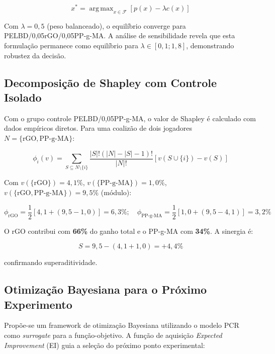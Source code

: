 \documentclass[12pt,a4paper,twoside]{article}
\DeclareMathOperator*{\argmax}{arg\,max}
\begin{document}
\begin{equation}
x^* = \argmax_{x \in \mathcal{F}} \left[p(x) - \lambda c(x)\right]
\label{eq:nash_equilibrium}
\end{equation}

Com $\lambda = 0,5$ (peso balanceado), o equilíbrio converge para PELBD/0,05rGO/0,05PP-g-MA. A análise de sensibilidade revela que esta formulação permanece como equilíbrio para $\lambda \in [0,1; 1,8]$, demonstrando robustez da decisão.

\subsection{Decomposição de Shapley com Controle Isolado}

Com o grupo controle PELBD/0,05PP-g-MA, o valor de Shapley \cite{Shapley1953} é calculado com dados empíricos diretos. Para uma coalizão de dois jogadores $N = \{\text{rGO}, \text{PP-g-MA}\}$:

\begin{equation}
\phi_i(v) = \sum_{S \subseteq N \setminus \{i\}} \frac{|S|! (|N|-|S|-1)!}{|N|!} [v(S \cup \{i\}) - v(S)]
\label{eq:shapley}
\end{equation}

Com $v(\{\text{rGO}\}) = 4,1\%$, $v(\{\text{PP-g-MA}\}) = 1,0\%$, $v(\{\text{rGO}, \text{PP-g-MA}\}) = 9,5\%$ (módulo):

\begin{equation}
\phi_{\text{rGO}} = \frac{1}{2}[4,1 + (9,5 - 1,0)] = 6,3\%; \quad \phi_{\text{PP-g-MA}} = \frac{1}{2}[1,0 + (9,5 - 4,1)] = 3,2\%
\label{eq:shapley_values}
\end{equation}

O rGO contribui com \textbf{66\%} do ganho total e o PP-g-MA com \textbf{34\%}. A sinergia é:

\begin{equation}
S = 9,5 - (4,1 + 1,0) = +4,4\%
\label{eq:sinergia_shapley}
\end{equation}

confirmando superaditividade.

\subsection{Otimização Bayesiana para o Próximo Experimento}

Propõe-se um framework de otimização Bayesiana utilizando o modelo PCR como \textit{surrogate} para a função-objetivo. A função de aquisição \textit{Expected Improvement} (EI) guia a seleção do próximo ponto experimental:
\end{document}
